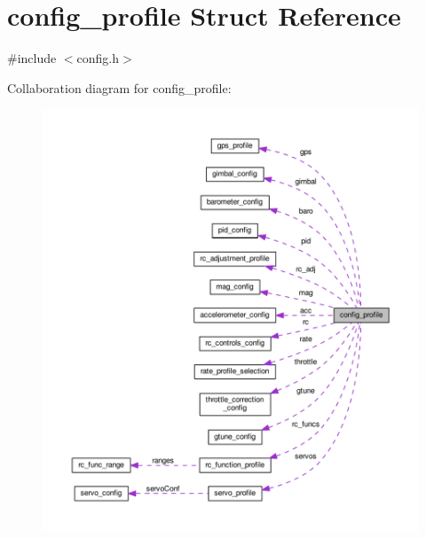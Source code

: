\hypertarget{structconfig__profile}{\section{config\+\_\+profile Struct Reference}
\label{structconfig__profile}
}


{\ttfamily \#include $<$config.\+h$>$}



Collaboration diagram for config\+\_\+profile\+:\nopagebreak
\begin{figure}[H]
\begin{center}
\leavevmode
\includegraphics[width=350pt]{structconfig__profile__coll__graph}
\end{center}
\end{figure}
